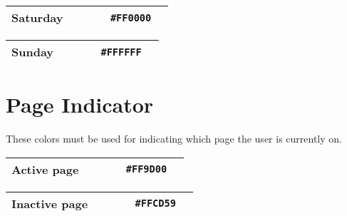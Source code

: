 \begin{table}[!htbp]
	\begin{tabularx}{\textwidth}{X r c r c}
		Saturday 
		& ~ & ~
		& \texttt{\#FF0000} & \cellcolor[HTML]{FF0000}\phantom{--} \\ \hline
	\end{tabularx}
\end{table}

\begin{table}[!htbp]
	\begin{tabularx}{\textwidth}{X r c r c}
		Sunday 
		& ~ & ~
		& \texttt{\#FFFFFF} & \cellcolor[HTML]{FFFFFF}\phantom{--} \\ \hline
	\end{tabularx}
\end{table}

\section{Page Indicator}
These colors must be used for indicating which page the user is currently on.

\begin{table}[!htbp]
	\begin{tabularx}{\textwidth}{X r c r c}
		Active page
		& ~ & ~
		& \texttt{\#FF9D00} & \cellcolor[HTML]{FF9D00}\phantom{--} \\ \hline
	\end{tabularx}
\end{table}

\begin{table}[!htbp]
	\begin{tabularx}{\textwidth}{X r c r c}
		Inactive page 
		& ~ & ~
		& \texttt{\#FFCD59} & \cellcolor[HTML]{FFCD59}\phantom{--} \\ \hline
	\end{tabularx}
\end{table}